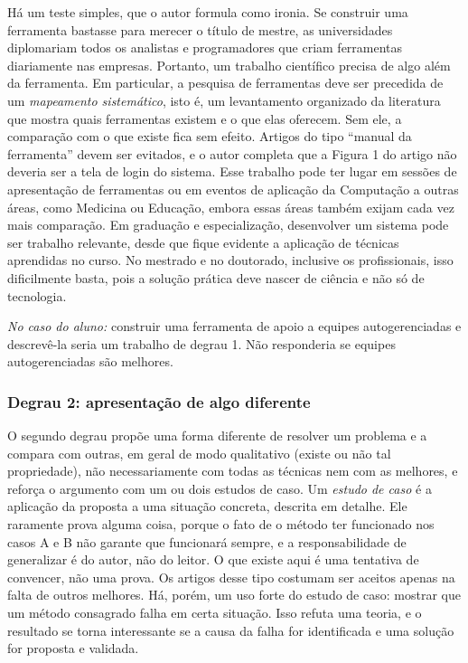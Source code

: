 \documentclass[10pt,a4paper]{extarticle}
\theoremstyle{definition}
\begin{document}
Há um teste simples, que o autor formula como ironia. Se construir uma ferramenta bastasse para merecer o título de mestre, as universidades diplomariam todos os analistas e programadores que criam ferramentas diariamente nas empresas. Portanto, um trabalho científico precisa de algo além da ferramenta. Em particular, a pesquisa de ferramentas deve ser precedida de um \emph{mapeamento sistemático}, isto é, um levantamento organizado da literatura que mostra quais ferramentas existem e o que elas oferecem. Sem ele, a comparação com o que existe fica sem efeito. Artigos do tipo \enquote{manual da ferramenta} devem ser evitados, e o autor completa que a Figura 1 do artigo não deveria ser a tela de login do sistema. Esse trabalho pode ter lugar em sessões de apresentação de ferramentas ou em eventos de aplicação da Computação a outras áreas, como Medicina ou Educação, embora essas áreas também exijam cada vez mais comparação. Em graduação e especialização, desenvolver um sistema pode ser trabalho relevante, desde que fique evidente a aplicação de técnicas aprendidas no curso. No mestrado e no doutorado, inclusive os profissionais, isso dificilmente basta, pois a solução prática deve nascer de ciência e não só de tecnologia.

\emph{No caso do aluno:} construir uma ferramenta de apoio a equipes autogerenciadas e descrevê-la seria um trabalho de degrau 1. Não responderia se equipes autogerenciadas são melhores.

\subsubsection*{Degrau 2: apresentação de algo diferente}

O segundo degrau propõe uma forma diferente de resolver um problema e a compara com outras, em geral de modo qualitativo (existe ou não tal propriedade), não necessariamente com todas as técnicas nem com as melhores, e reforça o argumento com um ou dois estudos de caso. Um \emph{estudo de caso} é a aplicação da proposta a uma situação concreta, descrita em detalhe. Ele raramente prova alguma coisa, porque o fato de o método ter funcionado nos casos A e B não garante que funcionará sempre, e a responsabilidade de generalizar é do autor, não do leitor. O que existe aqui é uma tentativa de convencer, não uma prova. Os artigos desse tipo costumam ser aceitos apenas na falta de outros melhores. Há, porém, um uso forte do estudo de caso: mostrar que um método consagrado falha em certa situação. Isso refuta uma teoria, e o resultado se torna interessante se a causa da falha for identificada e uma solução for proposta e validada.
\end{document}
